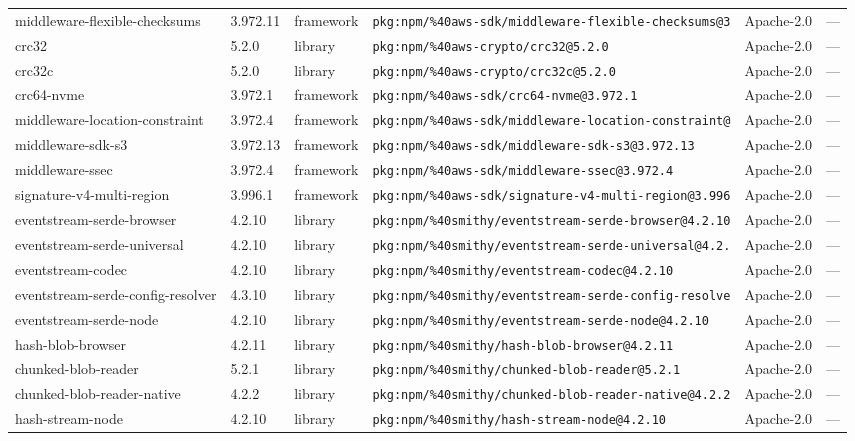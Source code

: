 \documentclass[11pt]{article}
\begin{document}
\begin{longtable}{|l|l|l|p{2.2cm}|l|p{4cm}|}
middleware-flexible-checksums & 3.972.11 & framework & \texttt{pkg:npm/\%40aws-sdk/middleware-flexible-checksums@3} & Apache-2.0 & — \\
crc32 & 5.2.0 & library & \texttt{pkg:npm/\%40aws-crypto/crc32@5.2.0} & Apache-2.0 & — \\
crc32c & 5.2.0 & library & \texttt{pkg:npm/\%40aws-crypto/crc32c@5.2.0} & Apache-2.0 & — \\
crc64-nvme & 3.972.1 & framework & \texttt{pkg:npm/\%40aws-sdk/crc64-nvme@3.972.1} & Apache-2.0 & — \\
middleware-location-constraint & 3.972.4 & framework & \texttt{pkg:npm/\%40aws-sdk/middleware-location-constraint@} & Apache-2.0 & — \\
middleware-sdk-s3 & 3.972.13 & framework & \texttt{pkg:npm/\%40aws-sdk/middleware-sdk-s3@3.972.13} & Apache-2.0 & — \\
middleware-ssec & 3.972.4 & framework & \texttt{pkg:npm/\%40aws-sdk/middleware-ssec@3.972.4} & Apache-2.0 & — \\
signature-v4-multi-region & 3.996.1 & framework & \texttt{pkg:npm/\%40aws-sdk/signature-v4-multi-region@3.996} & Apache-2.0 & — \\
eventstream-serde-browser & 4.2.10 & library & \texttt{pkg:npm/\%40smithy/eventstream-serde-browser@4.2.10} & Apache-2.0 & — \\
eventstream-serde-universal & 4.2.10 & library & \texttt{pkg:npm/\%40smithy/eventstream-serde-universal@4.2.} & Apache-2.0 & — \\
eventstream-codec & 4.2.10 & library & \texttt{pkg:npm/\%40smithy/eventstream-codec@4.2.10} & Apache-2.0 & — \\
eventstream-serde-config-resolver & 4.3.10 & library & \texttt{pkg:npm/\%40smithy/eventstream-serde-config-resolve} & Apache-2.0 & — \\
eventstream-serde-node & 4.2.10 & library & \texttt{pkg:npm/\%40smithy/eventstream-serde-node@4.2.10} & Apache-2.0 & — \\
hash-blob-browser & 4.2.11 & library & \texttt{pkg:npm/\%40smithy/hash-blob-browser@4.2.11} & Apache-2.0 & — \\
chunked-blob-reader & 5.2.1 & library & \texttt{pkg:npm/\%40smithy/chunked-blob-reader@5.2.1} & Apache-2.0 & — \\
chunked-blob-reader-native & 4.2.2 & library & \texttt{pkg:npm/\%40smithy/chunked-blob-reader-native@4.2.2} & Apache-2.0 & — \\
hash-stream-node & 4.2.10 & library & \texttt{pkg:npm/\%40smithy/hash-stream-node@4.2.10} & Apache-2.0 & — \\

\end{longtable}
\end{document}
